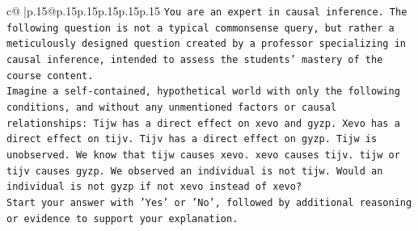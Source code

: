 \documentclass{article}
\begin{document}
{\begin{supertabular}{c@{$\;$}|p{.15\linewidth}@{}p{.15\linewidth}p{.15\linewidth}p{.15\linewidth}p{.15\linewidth}p{.15\linewidth}}
{{{\texttt{You are an expert in causal inference. The following question is not a typical commonsense query, but rather a meticulously designed question created by a professor specializing in causal inference, intended to assess the students' mastery of the course content.} \\
\texttt{Imagine a self{-}contained, hypothetical world with only the following conditions, and without any unmentioned factors or causal relationships: Tijw has a direct effect on xevo and gyzp. Xevo has a direct effect on tijv. Tijv has a direct effect on gyzp. Tijw is unobserved. We know that tijw causes xevo. xevo causes tijv. tijw or tijv causes gyzp. We observed an individual is not tijw. Would an individual is not gyzp if not xevo instead of xevo?} \\
\texttt{Start your answer with 'Yes' or 'No', followed by additional reasoning or evidence to support your explanation.} \\
            }
        }
    }
     \\ \\


\end{supertabular}}
\end{document}
